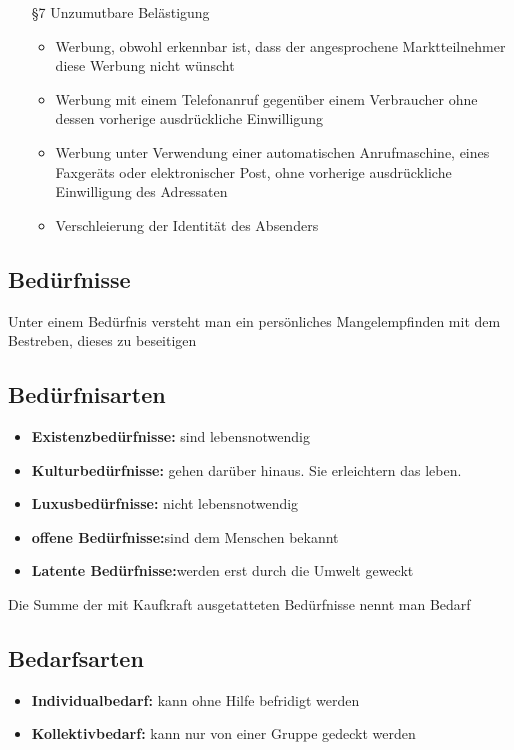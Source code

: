 \begin{itemize}
	\item[§7] Unzumutbare Belästigung
		\begin{itemize}
			\item Werbung, obwohl erkennbar ist, dass der angesprochene Marktteilnehmer diese Werbung nicht wünscht
			\item Werbung mit einem Telefonanruf gegenüber einem Verbraucher ohne dessen vorherige ausdrückliche Einwilligung
			\item Werbung unter Verwendung einer automatischen Anrufmaschine, eines Faxgeräts oder elektronischer Post, ohne vorherige ausdrückliche Einwilligung des Adressaten
			\item Verschleierung der Identität des Absenders
		\end{itemize}
\end{itemize}


\subsection{Bedürfnisse}
	Unter einem Bedürfnis versteht man ein persönliches Mangelempfinden mit dem Bestreben, dieses zu beseitigen
	
	\subsection{Bedürfnisarten}
	\begin{itemize}
	\item \textbf{Existenzbedürfnisse:} sind lebensnotwendig
	\item \textbf{Kulturbedürfnisse:} gehen darüber hinaus. Sie erleichtern das leben.
	\item \textbf{Luxusbedürfnisse:} nicht lebensnotwendig
	\item \textbf{offene Bedürfnisse:}sind dem Menschen bekannt
	\item \textbf{Latente Bedürfnisse:}werden erst durch die Umwelt geweckt
	\par
	\end{itemize}
	Die Summe der mit Kaufkraft ausgetatteten Bedürfnisse nennt man Bedarf
	
	\subsection{Bedarfsarten}
	\begin{itemize}
	\item \textbf{Individualbedarf:} kann ohne Hilfe befridigt werden
	\item \textbf{Kollektivbedarf:} kann nur von einer Gruppe gedeckt werden
	\end{itemize}
	
